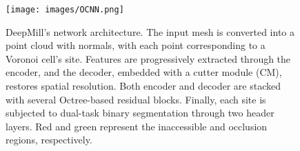 \begin{figure}[t]
\centering
\texttt{[image: images/OCNN.png]}
\caption{DeepMill's network architecture. The input mesh is converted into a point cloud with normals, with each point corresponding to a Voronoi cell's site. Features are progressively extracted through the encoder, and the decoder, embedded with a cutter module (CM), restores spatial resolution. Both encoder and decoder are stacked with several Octree-based residual blocks. Finally, each site is subjected to dual-task binary segmentation through two header layers. Red and green represent the inaccessible and occlusion regions, respectively.}
\label{fig:Cutter-embended}    
\end{figure}